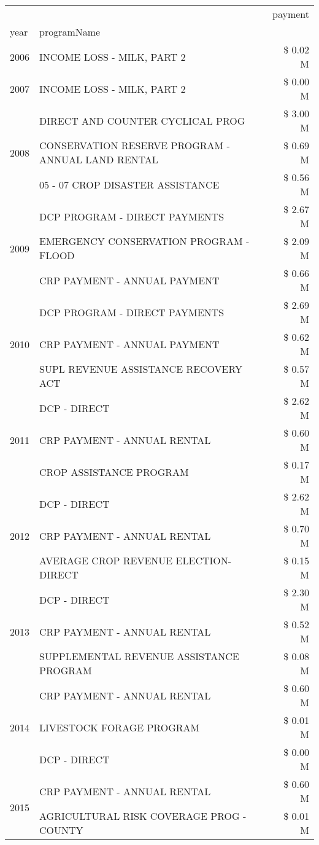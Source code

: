 \begin{tabular}{llr}
\toprule
 &  & payment \\
year & programName &  \\
\midrule
2006 & INCOME LOSS - MILK, PART 2 & \$ 0.02 M \\
\cline{1-3}
2007 & INCOME LOSS - MILK, PART 2 & \$ 0.00 M \\
\cline{1-3}
\multirow[t]{3}{*}{2008} & DIRECT AND COUNTER CYCLICAL PROG & \$ 3.00 M \\
 & CONSERVATION RESERVE PROGRAM - ANNUAL LAND RENTAL & \$ 0.69 M \\
 & 05 - 07 CROP DISASTER ASSISTANCE & \$ 0.56 M \\
\cline{1-3}
\multirow[t]{3}{*}{2009} & DCP PROGRAM - DIRECT PAYMENTS & \$ 2.67 M \\
 & EMERGENCY CONSERVATION PROGRAM - FLOOD & \$ 2.09 M \\
 & CRP PAYMENT - ANNUAL PAYMENT & \$ 0.66 M \\
\cline{1-3}
\multirow[t]{3}{*}{2010} & DCP PROGRAM - DIRECT PAYMENTS & \$ 2.69 M \\
 & CRP PAYMENT - ANNUAL PAYMENT & \$ 0.62 M \\
 & SUPL REVENUE ASSISTANCE RECOVERY ACT & \$ 0.57 M \\
\cline{1-3}
\multirow[t]{3}{*}{2011} & DCP - DIRECT & \$ 2.62 M \\
 & CRP PAYMENT - ANNUAL RENTAL & \$ 0.60 M \\
 & CROP ASSISTANCE PROGRAM & \$ 0.17 M \\
\cline{1-3}
\multirow[t]{3}{*}{2012} & DCP - DIRECT & \$ 2.62 M \\
 & CRP PAYMENT - ANNUAL RENTAL & \$ 0.70 M \\
 & AVERAGE CROP REVENUE ELECTION-DIRECT & \$ 0.15 M \\
\cline{1-3}
\multirow[t]{3}{*}{2013} & DCP - DIRECT & \$ 2.30 M \\
 & CRP PAYMENT - ANNUAL RENTAL & \$ 0.52 M \\
 & SUPPLEMENTAL REVENUE ASSISTANCE PROGRAM & \$ 0.08 M \\
\cline{1-3}
\multirow[t]{3}{*}{2014} & CRP PAYMENT - ANNUAL RENTAL & \$ 0.60 M \\
 & LIVESTOCK FORAGE PROGRAM & \$ 0.01 M \\
 & DCP - DIRECT & \$ 0.00 M \\
\cline{1-3}
\multirow[t]{3}{*}{2015} & CRP PAYMENT - ANNUAL RENTAL & \$ 0.60 M \\
 & AGRICULTURAL RISK COVERAGE PROG - COUNTY & \$ 0.01 M \\

\end{tabular}
